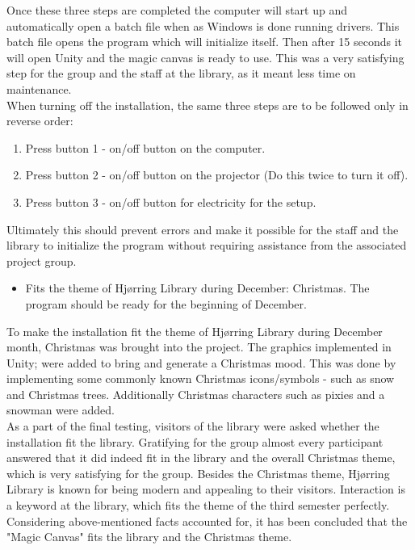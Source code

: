Once these three steps are completed the computer will start up and automatically open a batch file when as Windows is done running drivers. This batch file opens the program which will initialize itself. Then after 15 seconds it will open Unity and the magic canvas is ready to use. This was a very satisfying step for the group and the staff at the library, as it meant less time on maintenance.\\ 
When turning off the installation, the same three steps are to be followed only in reverse order:
\begin{enumerate}
\item Press button 1 - on/off button on the computer.
\item Press button 2 - on/off button on the projector (Do this twice to turn it off).
\item Press button 3 - on/off button for electricity for the setup.
\end{enumerate}
Ultimately this should prevent errors and make it possible for the staff and the library to initialize the program without requiring assistance from the associated project group.


\begin{itemize}
\item Fits the theme of Hj{\o}rring Library during December: Christmas. The program should be ready for the beginning of December.
\end{itemize}
To make the installation fit the theme of Hj{\o}rring Library during December month, Christmas was brought into the project. The graphics implemented in Unity; were added to bring and generate a Christmas mood. This was done by implementing some commonly known Christmas icons/symbols - such as snow and Christmas trees. Additionally Christmas characters such as pixies and a snowman were added.\\
As a part of the final testing, visitors of the library were asked whether the installation fit the library. Gratifying for the group almost every participant answered that it did indeed fit in the library and the overall Christmas theme, which is very satisfying for the group. Besides the Christmas theme, Hj{\o}rring Library is known for being modern and appealing to their visitors. Interaction is a keyword at the library, which fits the theme of the third semester perfectly. Considering above-mentioned facts accounted for, it has been concluded that the "Magic Canvas" fits the library and the Christmas theme. 


